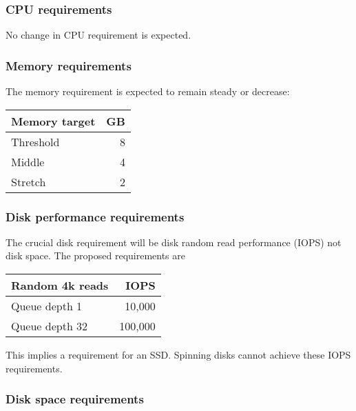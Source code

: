 \documentclass[11pt,a4paper]{article}
\begin{document}
\subsubsection{CPU requirements}

No change in CPU requirement is expected.

\subsubsection{Memory requirements}

The memory requirement is expected to remain steady or decrease:
\begin{center}
\begin{tabular}[]{lr}
  Memory target & GB \\
  \toprule
  Threshold &  8 \\
  Middle    &  4 \\
  Stretch   &  2
\end{tabular}
\end{center}

\subsubsection{Disk performance requirements}

The crucial disk requirement will be disk random read performance (IOPS) not
disk space. The proposed requirements are
\begin{center}
\begin{tabular}[]{lr}
  Random 4k reads & IOPS \\
  \toprule
  Queue depth 1  &  10,000 \\
  Queue depth 32 & 100,000 \\
\end{tabular}
\end{center}
This implies a requirement for an SSD. Spinning disks cannot achieve these IOPS
requirements.

\subsubsection{Disk space requirements}
\end{document}

